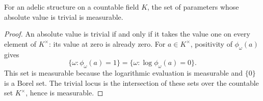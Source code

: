 \begin{lemma}
\label{lem:trivial-locus-measurable}
\leanok
{}
For an adelic structure on a countable field $K$, the set of
parameters whose absolute value is trivial is measurable.
\end{lemma}
\begin{proof}
An absolute value is trivial if and only if it takes the value one
on every element of $K^\times$: its value at zero is already zero.
For $a\in K^\times$, positivity of $\phi_\omega(a)$ gives
\[
 \{\omega:\phi_\omega(a)=1\}
 =\{\omega:\log\phi_\omega(a)=0\}.
\]
This set is measurable because the logarithmic evaluation is
measurable and $\{0\}$ is a Borel set. The trivial locus is the
intersection of these sets over the countable set $K^\times$, hence
is measurable.
\end{proof}
